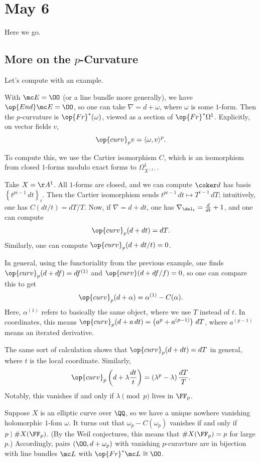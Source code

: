 \documentclass[../notes.tex]{subfiles}
\begin{document}
\section{May 6}
Here we go.

\subsection{More on the \texorpdfstring{$p$}{p}-Curvature}
Let's compute with an example.
\begin{remark}
	With $\mc E=\OO$ (or a line bundle more generally), we have $\op{End}\mc E=\OO$, so one can take $\nabla=d+\omega$, where $\omega$ is some $1$-form. Then the $p$-curvature is $\op{Fr}^*(\omega)$, viewed as a section of $\op{Fr}^*\Omega^1$. Explicitly, on vector fields $v$,
	\[\op{curv}_pv=\langle\omega,v\rangle^p.\]
\end{remark}
To compute this, we use the Cartier isomorphism $C$, which is an isomorphism from closed $1$-forms modulo exact forms to $\Omega^1_{X^{(1)}}$.
\begin{example}
	Take $X=\AA^1$. All $1$-forms are closed, and we can compute $\coker d$ has basis $\left\{t^{pi-1}\,dt\right\}_i$. Then the Cartier isomorphism sends $t^{pi-1}\,dt\mapsto T^{i-1}\,dT$; intuitively, one has $C(dt/t)=dT/T$. Now, if $\nabla=d+dt$, one has $\nabla_{\del_t}=\frac d{dt}+1$, and one can compute
	\[\op{curv}_p(d+dt)=dT.\]
	Similarly, one can compute $\op{curv}_p(d+dt/t)=0$. 
\end{example}
\begin{remark}
	In general, using the functoriality from the previous example, one finds $\op{curv}_p(d+df)=df^{(1)}$ and $\op{curv}(d+df/f)=0$, so one can compare this to get
	\[\op{curv}_p(d+\alpha)=\alpha^{(1)}-C(\alpha).\]
	Here, $\alpha^{(1)}$ refers to basically the same object, where we use $T$ instead of $t$. In coordinates, this means $\op{curv}_p(d+a\,dt)=\left(a^p+a^{(p-1)}\right)\,dT$, where $a^{(p-1)}$ means an iterated derivative.
\end{remark}
\begin{example}
	The same sort of calculation shows that $\op{curv}_p(d+dt)=dT$ in general, where $t$ is the local coordinate. Similarly,
	\[\op{curv}_p\left(d+\lambda\frac{dt}t\right)=\left(\lambda^p-\lambda\right)\frac{dT}T.\]
	Notably, this vanishes if and only if $\lambda\pmod p$ lives in $\FF_p$.
\end{example}
\begin{example}
	Suppose $X$ is an elliptic curve over $\QQ$, so we have a unique nowhere vanishing holomorphic $1$-fom $\omega$. It turns out that $\omega_p-C(\omega_p)$ vanishes if and only if $p\mid\#X(\FF_p)$. (By the Weil conjectures, this means that $\#X(\FF_p)=p$ for large $p$.) Accordingly, pairs $(\OO,d+\omega_p)$ with vanishing $p$-curavture are in bijection with line bundles $\mc L$ with $\op{Fr}^*\mc L\cong\OO$.
\end{example}
\end{document}
